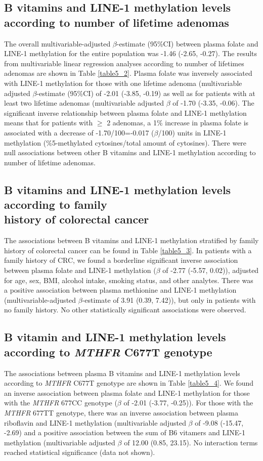 \subsection{B vitamins and LINE-1 methylation levels according to number of lifetime adenomas} %
\noindent The overall multivariable-adjusted $\beta$-estimate (95\%CI) between plasma folate and LINE-1 methylation for the entire population was -1.46 (-2.65, -0.27). The results from multivariable linear regression analyses according to number of lifetimes adenomas are shown in Table \ref{table5_2}. Plasma folate was inversely associated with LINE-1 methylation for those with one lifetime adenoma (multivariable adjusted $\beta$-estimate (95\%CI) of -2.01 (-3.85, -0.19) as well as for patients with at least two lifetime adenomas (multivariable adjusted $\beta$ of -1.70 (-3.35, -0.06). The significant inverse relationship between plasma folate and LINE-1 methylation means that for patients with $\geq$ 2 adenomas, a 1\% increase in plasma folate is associated with a decrease of -1.70/100=-0.017 ($\beta$/100) units in LINE-1 methylation (\%5-methylated cytosines/total amount of cytosines). There were null associations between other B vitamins and LINE-1 methylation according to number of lifetime adenomas.

\subsection{B vitamins and LINE-1 methylation levels according to family\\ history of colorectal cancer} %
\noindent The associations between B vitamins and LINE-1 methylation stratified by family history of colorectal cancer can be found in Table \ref{table5_3}. In patients with a family history of CRC, we found a borderline significant inverse association between plasma folate and LINE-1 methylation ($\beta$ of -2.77 (-5.57, 0.02)), adjusted for age, sex, BMI, alcohol intake, smoking status, and other analytes. There was a positive association between plasma methionine and LINE-1 methylation (multivariable-adjusted $\beta$-estimate of 3.91 (0.39, 7.42)), but only in patients with no family history. No other statistically significant associations were observed.

\subsection{B vitamin and LINE-1 methylation levels according to \emph{MTHFR} C677T genotype} %
\noindent The associations between plasma B vitamins and LINE-1 methylation levels according to \emph{MTHFR} C677T genotype are shown in Table \ref{table5_4}. We found an inverse association between plasma folate and LINE-1 methylation for those with the \emph{MTHFR} 677CC genotype ($\beta$ of -2.01 (-3.77, -0.25)). For those with the \emph{MTHFR} 677TT genotype, there was an inverse association between plasma riboflavin and LINE-1 methylation (multivariable adjusted $\beta$ of -9.08 (-15.47, -2.69) and a positive association between the sum of B6 vitamers and LINE-1 methylation (multivariable adjusted $\beta$ of 12.00 (0.85, 23.15). No interaction terms reached statistical significance (data not shown).

